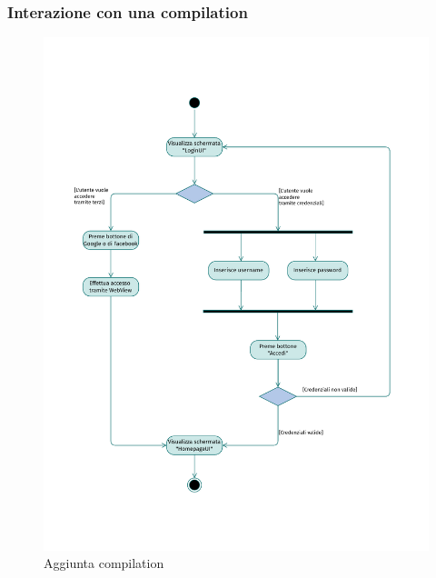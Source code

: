 \documentclass{natourDoc}
\begin{document}
\subsubsection{Interazione con una compilation}
\begin{figure}[!htbp]
	\centering
	\includegraphics[width=\textwidth, page=8]{./diagrams/activity.pdf}
	\caption{Aggiunta compilation}
\end{figure}
\FloatBarrier
\end{document}
